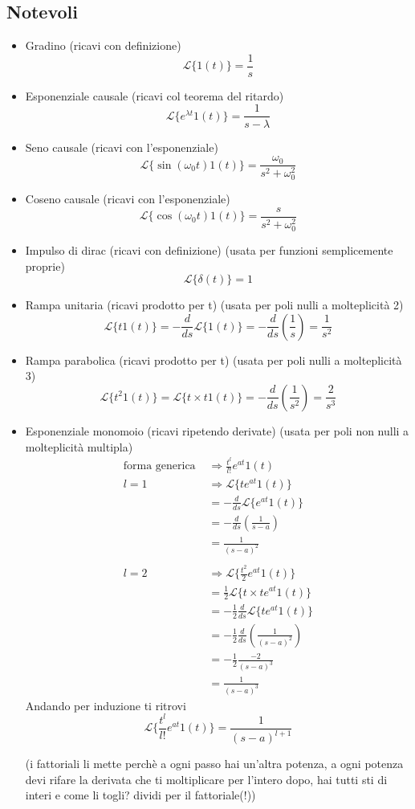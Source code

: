 \documentclass[11pt]{article}
\begin{document}
\subsection{Notevoli}
\label{sec:orgeb9d876}
\begin{itemize}
\item Gradino (ricavi con definizione)
\[ \mathcal{L}\{1(t)\} = \frac{1}{s} \]
\item Esponenziale causale (ricavi col teorema del ritardo)
\[ \mathcal{L}\{e^{\lambda t} 1(t)\} = \frac{1}{s- \lambda} \]
\item Seno causale (ricavi con l'esponenziale)
\[ \mathcal{L}\{\sin(\omega _0 t) 1(t)\} = \frac{\omega _0}{s^2 + \omega _0 ^2} \]
\item Coseno causale (ricavi con l'esponenziale)
\[ \mathcal{L}\{\cos(\omega _0 t) 1(t)\} = \frac{s}{s^2 + \omega _0 ^2} \]
\item Impulso di dirac (ricavi con definizione) (usata per funzioni semplicemente proprie)
\[ \mathcal{L}\{\delta (t)\} = 1 \]
\item Rampa unitaria (ricavi prodotto per t) (usata per poli nulli a molteplicità 2)
\[\mathcal{L}\{t 1(t)\} = -\frac{d}{ds} \mathcal{L}\{1(t)\}
	  = -\frac{d}{ds}(\frac{1}{s}) = \frac{1}{s^2}\]
\item Rampa parabolica (ricavi prodotto per t) (usata per poli nulli a molteplicità 3)
\[\mathcal{L}\{t^2 1(t)\} = \mathcal{L}\{t \times t 1(t)\} =
	  -\frac{d}{ds} (\frac{1}{s^2}) = \frac{2}{s^3}\]
\item Esponenziale \texttimes{} monomoio
(ricavi ripetendo derivate) (usata per poli non nulli a molteplicità multipla)
\begin{align*}
\text{forma generica } &\Rightarrow \frac{t^l}{l!} e^{at} 1(t) \\%
%
l=1 &\Rightarrow  \mathcal{L}\{t e^{at} 1(t)\} \\
& = -\frac{d}{ds} \mathcal{L}\{e^{at} 1(t)\} \\
& = -\frac{d}{ds} ( \frac{1}{s-a} ) \\
& = \frac{1}{(s-a)^2} \\ \\
%
l=2 &\Rightarrow \mathcal{L}\{\frac{t^2}{2} e^{at} 1(t)\} \\
& = \frac{1}{2} \mathcal{L}\{t \times t e^{at} 1(t)\} \\
& = -\frac{1}{2} \frac{d}{ds} \mathcal{L}\{t e^{at}1(t)\} \\
& = -\frac{1}{2} \frac{d}{ds} (\frac{1}{(s-a)^2}) \\
& = -\frac{1}{2} \frac{-2}{(s-a)^3} \\
& = \frac{1}{(s-a)^3}
\end{align*}
Andando per induzione ti ritrovi
\[ \mathcal{L}\{\frac{t^l}{l!} e^{at} 1(t)\} = \frac{1}{(s-a)^{l+1}}\]

(i fattoriali li mette perchè a ogni passo hai un'altra potenza, a ogni potenza devi
rifare la derivata che ti moltiplicare per l'intero dopo, hai tutti sti di interi e come
li togli? dividi per il fattoriale(!))
\end{itemize}
\end{document}
